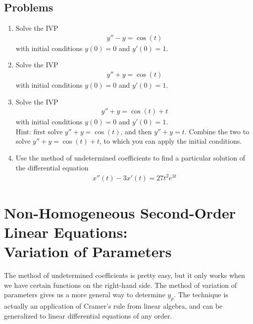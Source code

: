 \documentclass{book}
\begin{document}
\section{Problems}

\begin{enumerate}

\item
  Solve the IVP
  \begin{align*}
  y'' - y = \cos(t)
  \end{align*}
  with initial conditions $y(0)=0$ and $y'(0)=1$.

\item
  Solve the IVP
  \begin{align*}
  y'' + y = \cos(t)
  \end{align*}
  with initial conditions $y(0)=0$ and $y'(0)=1$.

\item
  Solve the IVP
  \begin{align*}
  y'' + y = \cos(t) + t
  \end{align*}
  with initial conditions $y(0)=0$ and $y'(0)=1$.\\
  Hint: first solve $y'' + y = \cos(t)$, and then $y'' + y = t$. Combine
  the two to solve $y'' + y = \cos(t) + t$, to which you can apply the
  initial conditions.

\item
  Use the method of undetermined coefficients to find a particular solution of
  the differential equation
  \begin{align*}
  x''(t) - 3x'(t) = 27t^2e^{3t}
  \end{align*}

\end{enumerate}


\chapter{Non-Homogeneous Second-Order Linear Equations:
  \\Variation of Parameters}
The method of undetermined coefficients is pretty easy, but it only works
when we have certain functions on the right-hand side. The method of
variation of parameters gives us a more general way to determine $y_p$.
The technique is actually an application of Cramer's rule from linear algebra,
and can be generalized to linear differential equations of any order.
\end{document}
